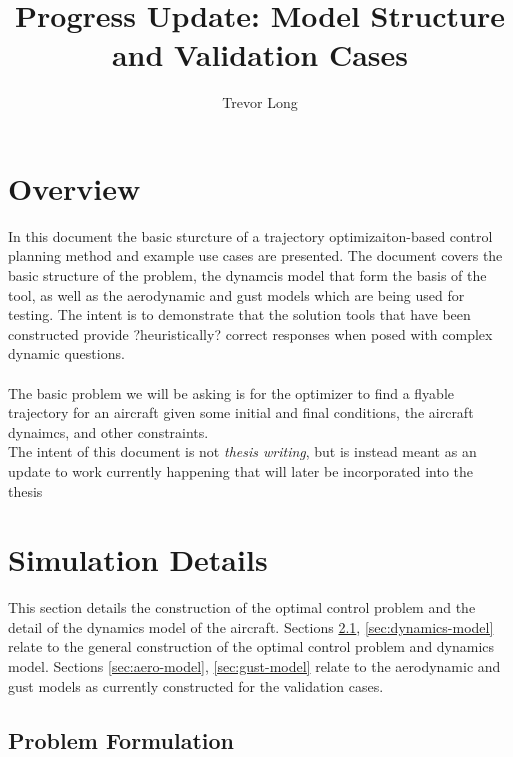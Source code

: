 \documentclass[]{article}
\title{Progress Update: Model Structure and Validation Cases}
\author{Trevor Long}
\begin{document}
	
	\maketitle
	
	\section{Overview}
	In this document the basic sturcture of a trajectory optimizaiton-based control planning method and example use cases are presented. 
	The document covers the basic structure of the problem, the dynamcis model that form the basis of the tool, as well as the aerodynamic and gust models which are being used for testing. 
	The intent is to demonstrate that the solution tools that have been constructed provide ?heuristically? correct responses when posed with complex dynamic questions. \\
	\\
	The basic problem we will be asking is for the optimizer to find a flyable trajectory for an aircraft given some initial and final conditions, the aircraft dynaimcs, and other constraints. 
	\\
	The intent of this document is not \textit{thesis writing}, but is instead meant as an update to work currently happening that will later be incorporated into the thesis
	
	\section{Simulation Details}
	
	This section details the construction of the optimal control problem and the detail of the dynamics model of the aircraft. Sections \ref{sec:traj-opt-problem}, \ref{sec:dynamics-model} relate to the general construction of the optimal control problem and dynamics model. Sections \ref{sec:aero-model}, \ref{sec:gust-model} relate to the aerodynamic and gust models as currently constructed for the validation cases. 
	
	\subsection{Problem Formulation} \label{sec:traj-opt-problem}
	
\end{document}
